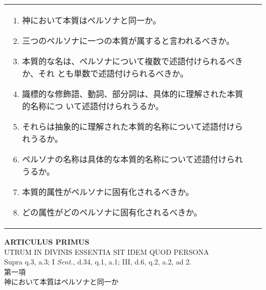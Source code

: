 \documentclass[10pt]{jsarticle} %
\begin{document}
\begin{longtable}{p{21em}p{21em}}
\begin{enumerate}
 \item 神において本質はペルソナと同一か。
 \item 三つのペルソナに一つの本質が属すると言われるべきか。
 \item 本質的な名は、ペルソナについて複数で述語付けられるべきか、それ
       とも単数で述語付けられるべきか。
 \item 識標的な修飾語、動詞、部分詞は、具体的に理解された本質的名称につ
       いて述語付けられうるか。
 \item それらは抽象的に理解された本質的名称について述語付けられうるか。
 \item ペルソナの名称は具体的な本質的名称について述語付けられうるか。
 \item 本質的属性がペルソナに固有化されるべきか。
 \item どの属性がどのペルソナに固有化されるべきか。

\end{enumerate}


\end{longtable}



\newpage



\begin{center}
 {\Large {\bf ARTICULUS PRIMUS}}\\
 {\large UTRUM IN DIVINIS ESSENTIA SIT IDEM QUOD PERSONA}\\
 {\footnotesize Supra q.3, a.3; I {\itshape Sent.}, d.34, q.1, a.1; III,
 d.6, q.2, a.2, ad 2.}\\
 {\Large 第一項\\神において本質はペルソナと同一か}
\end{center}
\end{document}
